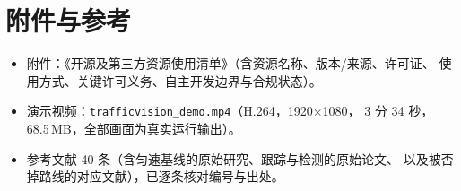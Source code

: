 \documentclass[11pt,a4paper]{ctexart}
\begin{document}
\section{附件与参考}

\begin{itemize}\setlength{\itemsep}{1pt}
  \item 附件：《开源及第三方资源使用清单》（含资源名称、版本/来源、许可证、
        使用方式、关键许可义务、自主开发边界与合规状态）。
  \item 演示视频：\texttt{trafficvision\_demo.mp4}（H.264，1920$\times$1080，
        3 分 34 秒，68.5\,MB，全部画面为真实运行输出）。
  \item 参考文献 40 条（含匀速基线的原始研究、跟踪与检测的原始论文、
        以及被否掉路线的对应文献），已逐条核对编号与出处。
\end{itemize}
\end{document}

